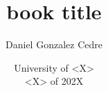 






\title{book title}
\author{Daniel Gonzalez Cedre}
\date{University of <X> \\ <X> of 202X}
\maketitle





